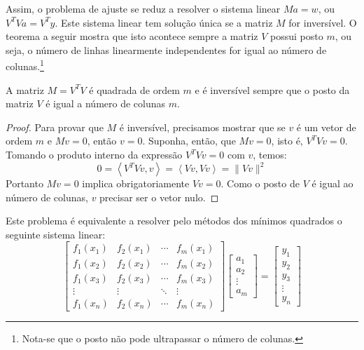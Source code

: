 Assim, o problema de ajuste se reduz a resolver o sistema linear $Ma=w$, ou $V^TVa = V^T y$. Este sistema linear tem solução única se a matriz $M$ for inversível. O teorema a seguir mostra que isto acontece sempre a matriz $V$ possui posto $m$, ou seja, o número de linhas linearmente independentes for igual ao número de colunas.\footnote{Nota-se que o posto não pode ultrapassar o número de colunas.}


\begin{teo}
A matriz $M=V^TV$ é quadrada de ordem $m$ e é inversível sempre que o posto da matriz $V$ é igual a número de colunas $m$.
\end{teo}
\begin{proof}
Para provar que $M$ é inversível, precisamos mostrar que se $v$ é um vetor de ordem $m$ e $Mv=0$, então $v=0$. Suponha, então, que $Mv=0$, isto é,
$V^TVv=0$. Tomando o produto interno da expressão $V^TVv=0$ com $v$, temos:
\begin{equation} 0=\left<V^TVv,v\right>=\left<Vv,Vv\right>=\|Vv\|^2 \end{equation}
Portanto $Mv=0$ implica obrigatoriamente $Vv=0$. Como o posto de $V$ é igual ao número de colunas, $v$ precisar ser o vetor nulo.
\end{proof}

\begin{obs} Este problema é equivalente a resolver pelo métodos dos mínimos quadrados o seguinte sistema linear:
  \begin{equation}
    \begin{bmatrix}
      f_1(x_1)&f_2(x_1) & \cdots & f_m(x_1)\\
      f_1(x_2)&f_2(x_2) & \cdots & f_m(x_2)\\
      f_1(x_3)&f_2(x_3) & \cdots & f_m(x_3)\\
      \vdots & \vdots & \ddots & \vdots\\
      f_1(x_n)&f_2(x_n) & \cdots & f_m(x_n)
    \end{bmatrix}
    \begin{bmatrix}
      a_1\\
      a_2\\
      \vdots\\
      a_m
    \end{bmatrix}
    =\begin{bmatrix}
      y_1\\
      y_2\\
      y_3\\
      \vdots\\
      y_n
    \end{bmatrix}
  \end{equation}
\end{obs}


